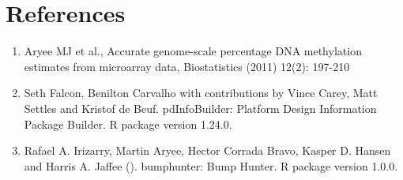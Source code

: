 \documentclass[11pt]{article}
\begin{document}
\section*{References}  
\begin{enumerate}


	\item  Aryee MJ et al., Accurate genome-scale percentage DNA methylation estimates
	  from microarray data, Biostatistics (2011) 12(2): 197-210 	

	\item  Seth Falcon, Benilton Carvalho with contributions by Vince Carey, Matt
	  Settles and Kristof de Beuf. pdInfoBuilder: Platform Design Information
	  Package Builder. R package version 1.24.0.
	
	\item   Rafael A. Irizarry, Martin Aryee, Hector Corrada Bravo, Kasper D. Hansen and	Harris A. Jaffee (). bumphunter: Bump Hunter. R package version 1.0.0.
		
 \end{enumerate}

 
 
 
 
 
\end{document}

